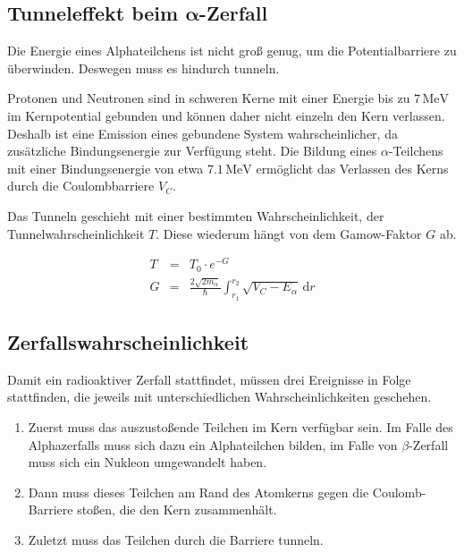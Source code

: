 \documentclass[12pt,a4paper]{scrartcl}
\numberwithin{equation}{section} %
\renewcommand{\[}{} %
\renewcommand{\]}{\noindent} %
\newcommand{\tightlist}{} %
\begin{document}
\hypertarget{tunneleffekt-beim-pmbalpha-zerfall}{%
\subsection{\texorpdfstring{Tunneleffekt beim
\(\pmb{\alpha}\)-Zerfall}{Tunneleffekt beim \textbackslash pmb\{\textbackslash alpha\}-Zerfall}}\label{tunneleffekt-beim-pmbalpha-zerfall}}

Die Energie eines Alphateilchens ist nicht groß genug, um die
Potentialbarriere zu überwinden. Deswegen muss es hindurch tunneln.

Protonen und Neutronen sind in schweren Kerne mit einer Energie bis zu
\(7\mathrm{\,MeV}\) im Kernpotential gebunden und können daher nicht
einzeln den Kern verlassen. Deshalb ist eine Emission eines gebundene
System wahrscheinlicher, da zusätzliche Bindungsenergie zur Verfügung
steht. Die Bildung eines \(\alpha\)-Teilchens mit einer Bindungsenergie
von etwa \(7.1\mathrm{\,MeV}\) ermöglicht das Verlassen des Kerns durch
die Coulombbarriere \(V_C\).

Das Tunneln geschieht mit einer bestimmten Wahrscheinlichkeit, der
Tunnelwahrscheinlichkeit \(T\). Diese wiederum hängt von dem
Gamow-Faktor \(G\) ab.

\[
\begin{eqnarray}
        T &=& T_0 \cdot e^{-G} \\
        G &=&
                \frac{2\sqrt{2m_\alpha}}{\hbar}
                \int_{r_{1}}^{r_{2}}\sqrt{V_{C}-E_{\alpha}}
                \,\mathrm dr
\end{eqnarray}
\]

\hypertarget{zerfallswahrscheinlichkeit}{%
\subsection{Zerfallswahrscheinlichkeit}\label{zerfallswahrscheinlichkeit}}

Damit ein radioaktiver Zerfall stattfindet, müssen drei Ereignisse in
Folge stattfinden, die jeweils mit unterschiedlichen
Wahrscheinlichkeiten geschehen.

\begin{enumerate}
\def\labelenumi{\arabic{enumi}.}
\tightlist
\item
  Zuerst muss das auszustoßende Teilchen im Kern verfügbar sein. Im
  Falle des Alphazerfalls muss sich dazu ein Alphateilchen bilden, im
  Falle von \(\beta\)-Zerfall muss sich ein Nukleon umgewandelt haben.
\item
  Dann muss dieses Teilchen am Rand des Atomkerns gegen die
  Coulomb-Barriere stoßen, die den Kern zusammenhält.
\item
  Zuletzt muss das Teilchen durch die Barriere tunneln.
\end{enumerate}
\end{document}

